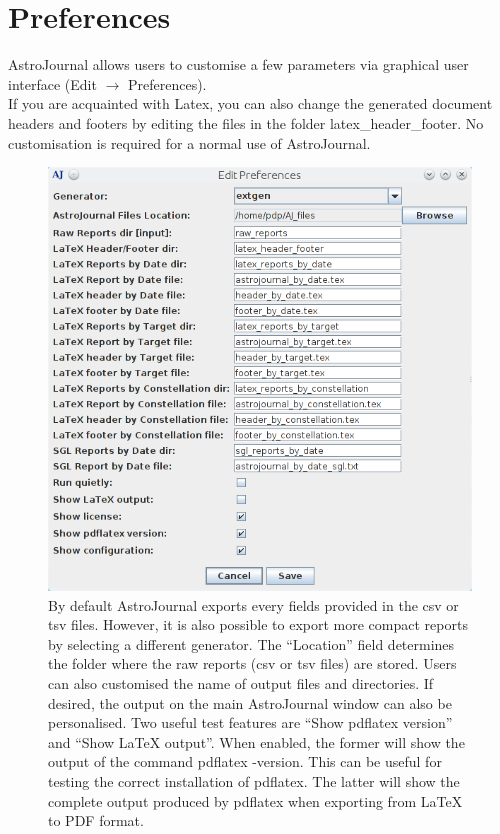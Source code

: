 \section{Preferences}
\label{sec:Preferences}
AstroJournal allows users to customise a few parameters via graphical user interface (Edit $\rightarrow$ Preferences).\\
If you are acquainted with Latex, you can also change the generated document headers and footers by editing the files in the folder latex\_header\_footer. No customisation is required for a normal use of AstroJournal.

\begin{center}
\begin{figure}
\includegraphics[width=1.0\textwidth]{images/preferences}\par\vspace{1cm}
\caption[AstroJournal customisation]{By default AstroJournal exports every fields provided in the csv or tsv files. However, it is also possible to export more compact reports by selecting a different generator. The ``Location'' field determines the folder where the raw reports (csv or tsv files) are stored. Users can also customised the name of output files and directories. If desired, the output on the main AstroJournal window can also be personalised. Two useful test features are ``Show pdflatex version'' and ``Show LaTeX output''. When enabled, the former will show the output of the command pdflatex -version. This can be useful for testing the correct installation of pdflatex. The latter will show the complete output produced by pdflatex when exporting from LaTeX to PDF format.}
\end{figure}
\end{center}
